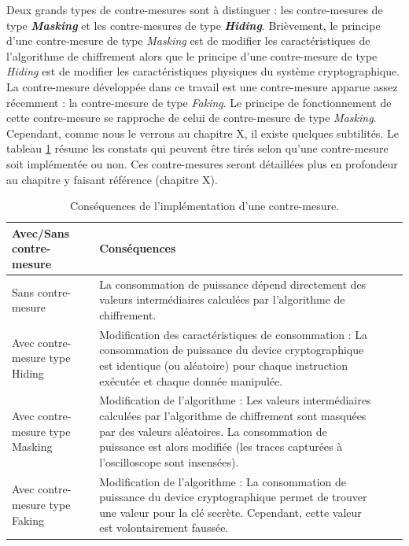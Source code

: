 \documentclass[oneside]{book}
\begin{document}
Deux grands types de contre-mesures sont à distinguer : les contre-mesures de type \textbf{\textit{Masking}} et les contre-mesures de type \textbf{\textit{Hiding}}. Brièvement, le principe d'une contre-mesure de type \textit{Masking} est de modifier les caractéristiques de l'algorithme de chiffrement alors que le principe d'une contre-mesure de type \textit{Hiding} est de modifier les caractéristiques physiques du système cryptographique. La contre-mesure développée dans ce travail est une contre-mesure apparue assez récemment : la contre-mesure de type \textit{Faking}. Le principe de fonctionnement de cette contre-mesure se rapproche de celui de contre-mesure de type \textit{Masking}. Cependant, comme nous le verrons au chapitre X, il existe quelques subtilités. Le tableau \ref{fig:intro2} résume les constats qui peuvent être tirés selon qu'une contre-mesure soit implémentée ou non. Ces contre-mesures seront détaillées plus en profondeur au chapitre y faisant référence (chapitre X).

\begin{table}
	\centering
	\begin{tabular}{|l|m{9cm}|l|m{3cm}|}
    		\hline
   		 Avec/Sans contre-mesure & Conséquences \\ \hline
    		Sans contre-mesure & La consommation de puissance dépend directement des valeurs intermédiaires calculées par l’algorithme de chiffrement. \\ \hline
		Avec contre-mesure type Hiding & Modification des caractéristiques de consommation : La consommation de puissance du device cryptographique est identique (ou aléatoire) pour chaque instruction exécutée et chaque donnée manipulée. \\ \hline
    		Avec contre-mesure type Masking & Modification de l’algorithme : Les valeurs intermédiaires calculées par l’algorithme de chiffrement sont masquées par des valeurs aléatoires. La consommation de puissance est alors modifiée (les traces capturées à l’oscilloscope sont insensées). \\ \hline
		Avec contre-mesure type Faking & Modification de l’algorithme : La consommation de puissance du device cryptographique permet de trouver une valeur pour la clé secrète. Cependant, cette valeur est volontairement faussée. \\ \hline
 	\end{tabular}
 	\caption{Conséquences de l'implémentation d'une contre-mesure.}
 	\label{fig:intro2}
\end{table}
\end{document}
